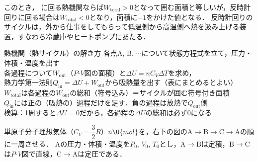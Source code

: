 このとき，\,\,に回る熱機関ならば$W_{\mathrm{total}}>0$となって囲む面積と等しいが，{\gtfamily 反時計回り}に回る場合は$W_{\mathrm{total}}<0$となり，面積に$-1$をかけた値となる．
反時計回りのサイクルは，外から仕事をしてもらって低温側から高温側へ熱を汲み上げる装置，すなわち冷蔵庫やヒートポンプにあたる．

\bsNeed{56mm}
\begin{matome}{熱機関（熱サイクル）の解き方}
 \hspace{3mm} \hspace{2mm} 各点$\mathrm{A}$, $\mathrm{B}$, $\cdots$について状態方程式を立て，圧力・体積・温度を出す\\[0.5mm]
 \hspace{3mm} \hspace{2mm} 各過程について$W_{\mathrm{out}}$（$P$-$V$図の面積）と$\Delta U=nC_V\Delta T$を求め，\\
 \hspace{10mm} 熱力学第一法則$Q_{\mathrm{in}}=\Delta U+W_{\mathrm{out}}$から吸熱量を出す（表にまとめるとよい）\\[0.5mm]
 \hspace{3mm} \hspace{2mm} $W_{\mathrm{total}}$は各過程の$W_{\mathrm{out}}$の総和（符号込み）＝サイクルが囲む符号付き面積\\[0.5mm]
 \hspace{3mm} \hspace{2mm} $Q_{\mathrm{in}}$には{\gtfamily 正の（吸熱の）過程だけ}を足す．負の過程は放熱で$Q_{\mathrm{out}}$側\\[1mm]
 \hspace{3mm} 検算：1周すると$\Delta U=0$だから，各過程の$\Delta U$の総和は必ず$0$になる
\end{matome}

\bsNeed{120mm}

単原子分子理想気体（$C_V=\dfrac{3}{2}R$）$n\U{mol}$を，右下の図の$\mathrm{A}\rightarrow\mathrm{B}\rightarrow\mathrm{C}\rightarrow\mathrm{A}$の順に一周させる．
$\mathrm{A}$の圧力・体積・温度を$P_0$, $V_0$, $T_0$とし，$\mathrm{A}\rightarrow\mathrm{B}$は定積，$\mathrm{B}\rightarrow\mathrm{C}$は$P$-$V$図で直線，$\mathrm{C}\rightarrow\mathrm{A}$は定圧である．

